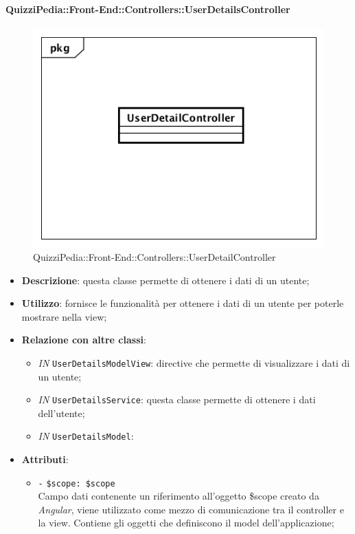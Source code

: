 \begin{itemize}
\paragraph{QuizziPedia::Front-End::Controllers::UserDetailsController}
\begin{figure} [ht]
	\centering
	\includegraphics[scale=0.45]{UML/Classi/Front-End/QuizziPedia_Front-end_Controller_UserDetailController.png}
	\caption{QuizziPedia::Front-End::Controllers::UserDetailController}
\end{figure} \FloatBarrier
\begin{itemize}
	\item \textbf{Descrizione}: questa classe permette di ottenere i dati di un utente;
	\item \textbf{Utilizzo}: fornisce le funzionalità per ottenere i dati di un utente per poterle mostrare nella view;
	\item \textbf{Relazione con altre classi}:
	\begin{itemize}
		\item \textit{IN} \texttt{UserDetailsModelView}: directive che permette di visualizzare i dati di un utente; 
		\item \textit{IN} \texttt{UserDetailsService}: questa classe permette di ottenere i dati dell'utente;
		\item \textit{IN} \texttt{UserDetailsModel}: 
	\end{itemize}
	\item \textbf{Attributi}:
	\begin{itemize}
		\item \texttt{-} \texttt{\$scope: \$scope} \\
		Campo dati contenente un riferimento all’oggetto \$scope creato da \textit{Angular}, viene utilizzato come mezzo di comunicazione tra il controller e la view. Contiene gli oggetti che definiscono il model dell’applicazione;

\end{itemize}
\end{itemize}
\end{itemize}
